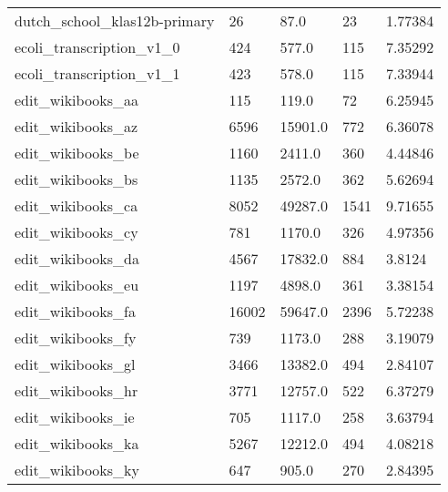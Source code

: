 \begin{longtable}{lllll}
 dutch\_school\_klas12b-primary                       & 26         & 87.0        & 23    & 1.77384    \\
 ecoli\_transcription\_v1\_0                           & 424        & 577.0       & 115   & 7.35292    \\
 ecoli\_transcription\_v1\_1                           & 423        & 578.0       & 115   & 7.33944    \\
 edit\_wikibooks\_aa                                  & 115        & 119.0       & 72    & 6.25945    \\
 edit\_wikibooks\_az                                  & 6596       & 15901.0     & 772   & 6.36078    \\
 edit\_wikibooks\_be                                  & 1160       & 2411.0      & 360   & 4.44846    \\
 edit\_wikibooks\_bs                                  & 1135       & 2572.0      & 362   & 5.62694    \\
 edit\_wikibooks\_ca                                  & 8052       & 49287.0     & 1541  & 9.71655    \\
 edit\_wikibooks\_cy                                  & 781        & 1170.0      & 326   & 4.97356    \\
 edit\_wikibooks\_da                                  & 4567       & 17832.0     & 884   & 3.8124     \\
 edit\_wikibooks\_eu                                  & 1197       & 4898.0      & 361   & 3.38154    \\
 edit\_wikibooks\_fa                                  & 16002      & 59647.0     & 2396  & 5.72238    \\
 edit\_wikibooks\_fy                                  & 739        & 1173.0      & 288   & 3.19079    \\
 edit\_wikibooks\_gl                                  & 3466       & 13382.0     & 494   & 2.84107    \\
 edit\_wikibooks\_hr                                  & 3771       & 12757.0     & 522   & 6.37279    \\
 edit\_wikibooks\_ie                                  & 705        & 1117.0      & 258   & 3.63794    \\
 edit\_wikibooks\_ka                                  & 5267       & 12212.0     & 494   & 4.08218    \\
 edit\_wikibooks\_ky                                  & 647        & 905.0       & 270   & 2.84395    \\

\end{longtable}
